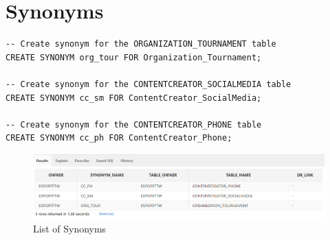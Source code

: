 \vspace{4cm}

\section{Synonyms}
\hrulefill

\begin{lstlisting}[caption={Synonyms}]
-- Create synonym for the ORGANIZATION_TOURNAMENT table
CREATE SYNONYM org_tour FOR Organization_Tournament;

-- Create synonym for the CONTENTCREATOR_SOCIALMEDIA table
CREATE SYNONYM cc_sm FOR ContentCreator_SocialMedia;

-- Create synonym for the CONTENTCREATOR_PHONE table
CREATE SYNONYM cc_ph FOR ContentCreator_Phone;
\end{lstlisting}

\begin{figure}[H]
    \centering
    \includegraphics[width=1\textwidth]{images/dml/syn/syn.png}
    \caption{List of Synonyms}
\end{figure}